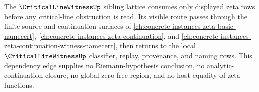 The $\CriticalLineWitnessUp$ sibling lattice consumes only displayed zeta rows before any critical-line obstruction is read. Its visible route passes through the finite source and continuation surfaces of \autoref{ch:concrete-instances-zeta-basic-namecert}, \autoref{ch:concrete-instances-zeta-continuation}, and \autoref{ch:concrete-instances-zeta-continuation-witness-namecert}, then returns to the local $\CriticalLineWitnessUp$ classifier, replay, provenance, and naming rows. This dependency edge supplies no Riemann-hypothesis conclusion, no analytic-continuation closure, no global zero-free region, and no host equality of zeta functions.
